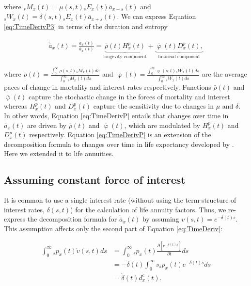 \documentclass[12pt]{article}
\begin{document}
where ${}_sM_x(t)= \mu(s,t){}_sE_x(t) \bar{a}_{x+s}(t)$ and ${}_sW_x(t)=\delta(s,t)  {}_sE_x(t) \bar{a}_{x+s}(t)$. We can express Equation \ref{eq:TimeDerivP3} in terms of the duration and entropy


\begin{equation}\label{eq:TimeDerivP}
\begin{split}
 \acute{\bar{a}}_x(t) = \frac{\dot{\bar{a}}_x(t)}{\bar{a}_x(t)}  = 
 \underbrace{\bar{\rho}(t){H}^{p}_x(t)}_\text{longevity component}
 +\underbrace{\bar{\upvarphi}(t){D}^{p}_x(t),}_\text{financial component}
\end{split}
\end{equation}

where $\bar{\rho}(t)= \frac{\int_0^\infty \rho(s,t) {}_sM_x(t)  ds}{\int_0^\infty  {}_sM_x(t)ds}$ and 
$\bar{\upvarphi}(t)= \frac{\int_0^\infty \upvarphi(s,t) {}_sW_x(t)  ds}{\int_0^\infty {}_sW_x(t) ds}$ are the average paces of change in mortality and interest rates respectively. Functions $\bar{\rho}(t)$ and $\bar{\upvarphi}(t)$ capture the stochastic change in the forces of mortality and interest whereas ${H}^{p}_x(t)$ and ${D}^{p}_x(t)$ capture the sensitivity due to changes in $\mu$ and $\delta$. In other words, Equation \ref{eq:TimeDerivP} entails that changes over time in $\bar{a}_x(t)$ are driven by $\bar{\rho}(t)$ and $\bar{\upvarphi}(t)$, which are modulated by ${H}^{p}_x(t)$ and ${D}^{p}_x(t)$ respectively. Equation \ref{eq:TimeDerivP} is an extension of the decomposition formula to changes over time in life expectancy developed by \citet{Vaupel2003}. Here we extended it to life annuities.



\subsection{Assuming constant force of interest}


It is common to use a single interest rate (without using the term-structure of interest rates, $\delta(s,t)$) for the calculation of life annuity factors. Thus, we re-express the decomposition formula for $\acute{\bar{a}}_x(t)$ by assuming $v(s,t)=e^{-\delta(t)s}$. This assumption affects only the second part of Equation \ref{eq:TimeDeriv}: 




\begin{equation}\label{eq:TimeDerivC1}
\begin{split}
\int_0^\infty {}_s{p}_x(t) \dot{v}(s,t)ds &=\int_0^\infty {}_s{p}_x(t) \frac{\partial \left[ e^{-\delta(t)s} \right]}{\partial t}ds \\
&=-\dot{\delta}(t)\int_0^\infty s  {}_s{p}_x(t) e^{-\delta(t)s} ds \\
&=  \dot{\delta}(t)  d^{c}_x(t).
\end{split}
\end{equation}
\end{document}
